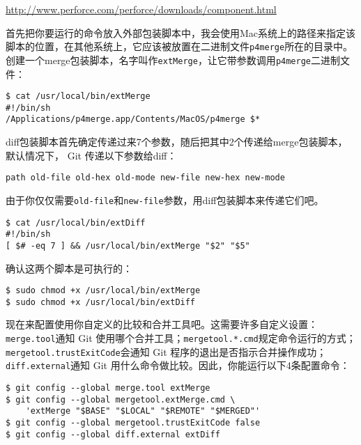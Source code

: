 \documentclass[a4paper]{book}
\begin{document}
\url{http://www.perforce.com/perforce/downloads/component.html}

首先把你要运行的命令放入外部包装脚本中，我会使用Mac系统上的路径来指定该脚本的位置，在其他系统上，它应该被放置在二进制文件\texttt{p4merge}所在的目录中。创建一个merge包装脚本，名字叫作\texttt{extMerge}，让它带参数调用\texttt{p4merge}二进制文件：

\begin{shaded}\begin{verbatim}
$ cat /usr/local/bin/extMerge
#!/bin/sh
/Applications/p4merge.app/Contents/MacOS/p4merge $*
\end{verbatim}\end{shaded}

diff包装脚本首先确定传递过来7个参数，随后把其中2个传递给merge包装脚本，默认情况下， Git 传递以下参数给diff：

\begin{shaded}\begin{verbatim}
path old-file old-hex old-mode new-file new-hex new-mode
\end{verbatim}\end{shaded}

由于你仅仅需要\texttt{old-file}和\texttt{new-file}参数，用diff包装脚本来传递它们吧。

\begin{shaded}\begin{verbatim}
$ cat /usr/local/bin/extDiff 
#!/bin/sh
[ $# -eq 7 ] && /usr/local/bin/extMerge "$2" "$5"
\end{verbatim}\end{shaded}

确认这两个脚本是可执行的：

\begin{shaded}\begin{verbatim}
$ sudo chmod +x /usr/local/bin/extMerge 
$ sudo chmod +x /usr/local/bin/extDiff
\end{verbatim}\end{shaded}

现在来配置使用你自定义的比较和合并工具吧。这需要许多自定义设置：\texttt{merge.tool}通知 Git 使用哪个合并工具；\texttt{mergetool.*.cmd}规定命令运行的方式；\texttt{mergetool.trustExitCode}会通知 Git 程序的退出是否指示合并操作成功；\texttt{diff.external}通知 Git 用什么命令做比较。因此，你能运行以下4条配置命令：

\begin{shaded}\begin{verbatim}
$ git config --global merge.tool extMerge
$ git config --global mergetool.extMerge.cmd \
    'extMerge "$BASE" "$LOCAL" "$REMOTE" "$MERGED"'
$ git config --global mergetool.trustExitCode false
$ git config --global diff.external extDiff
\end{verbatim}\end{shaded}
\end{document}

